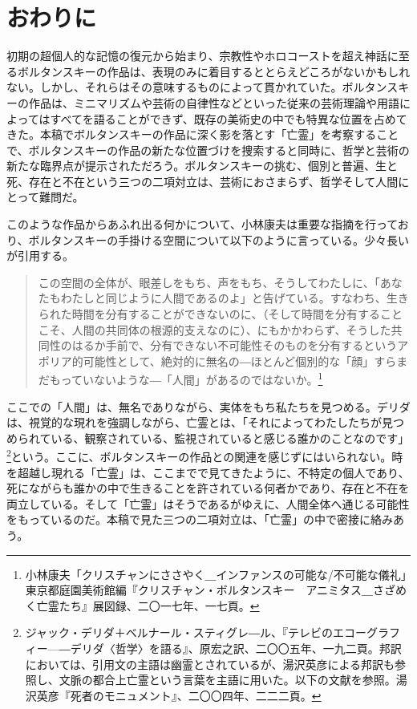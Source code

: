 \documentclass[b5j,twoside,twocolumn]{utarticle}
\newcommand{\mysection}[1]{\vspace{-5mm}\section{#1}\vspace{-2mm}}
\begin{document}
\mysection{おわりに}
初期の超個人的な記憶の復元から始まり、宗教性やホロコーストを超え神話に至るボルタンスキーの作品は、表現のみに着目するととらえどころがないかもしれない。しかし、それらはその意味するものによって貫かれていた。ボルタンスキーの作品は、ミニマリズムや芸術の自律性などといった従来の芸術理論や用語によってはすべてを語ることができず、既存の美術史の中でも特異な位置を占めてきた。本稿でボルタンスキーの作品に深く影を落とす「亡霊」を考察することで、ボルタンスキーの作品の新たな位置づけを捜索すると同時に、哲学と芸術の新たな臨界点が提示されただろう。ボルタンスキーの挑む、個別と普遍、生と死、存在と不在という三つの二項対立は、芸術におさまらず、哲学そして人間にとって難問だ。


このような作品からあふれ出る何かについて、小林康夫は重要な指摘を行っており、ボルタンスキーの手掛ける空間について以下のように言っている。少々長いが引用する。

\begin{quote}
この空間の全体が、眼差しをもち、声をもち、そうしてわたしに、「あなたもわたしと同じように人間であるのよ」と告げている。すなわち、生きられた時間を分有することができないのに、（そして時間を分有することこそ、人間の共同体の根源的支えなのに）、にもかかわらず、そうした共同性のはるか手前で、分有できない不可能性そのものを分有するというアポリア的可能性として、絶対的に無名の―ほとんど個別的な「顔」すらまだもっていないような―「人間」があるのではないか。\footnote{小林康夫「クリスチャンにささやく＿インファンスの可能な/不可能な儀礼」東京都庭園美術館編『クリスチャン・ボルタンスキー　アニミタス＿さざめく亡霊たち』展図録、二〇一七年、一七頁。}

\end{quote}


ここでの「人間」は、無名でありながら、実体をもち私たちを見つめる。デリダは、視覚的な現れを強調しながら、亡霊とは、「それによってわたしたちが見つめられている、観察されている、監視されていると感じる誰かのことなのです」\footnote{ジャック・デリダ＋ベルナール・スティグレ―ル、『テレビのエコーグラフィー—―デリダ〈哲学〉を語る』、原宏之訳、二〇〇五年、一九二頁。邦訳においては、引用文の主語は幽霊とされているが、湯沢英彦による邦訳も参照し、文脈の都合上亡霊という言葉を主語に用いた。以下の文献を参照。湯沢英彦『死者のモニュメント』、二〇〇四年、二二二頁。}という。ここに、ボルタンスキーの作品との関連を感じずにはいられない。時を超越し現れる「亡霊」は、ここまでで見てきたように、不特定の個人であり、死にながらも誰かの中で生きることを許されている何者かであり、存在と不在を両立している。そして「亡霊」はそうであるがゆえに、人間全体へ通じる可能性をもっているのだ。本稿で見た三つの二項対立は、「亡霊」の中で密接に絡みあう。
\end{document}
